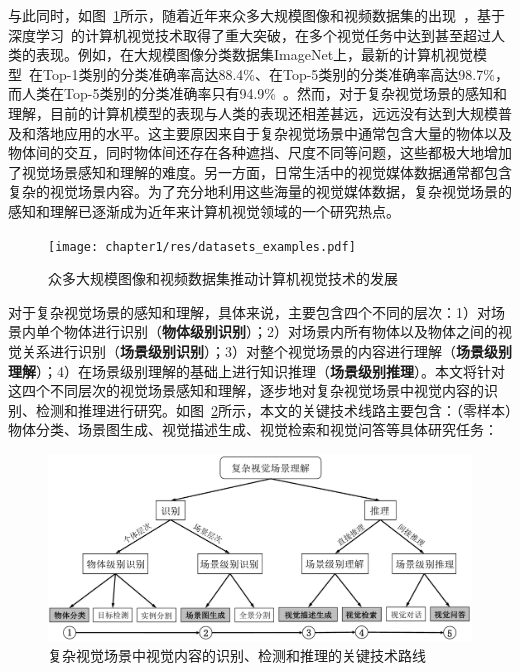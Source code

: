 与此同时，如图~\ref{ch1:fig:datasets_examples}所示，随着近年来众多大规模图像和视频数据集的出现~\cite{lin2014microsoft,russakovsky2015imagenet,krishna2017visual,karpathy2014large,miech2019howto100m}，基于深度学习~\cite{lecun2015deep,krizhevsky2012imagenet}的计算机视觉技术取得了重大突破，在多个视觉任务中达到甚至超过人类的表现。例如，在大规模图像分类数据集ImageNet上，最新的计算机视觉模型~\cite{xie2019self}在Top-1类别的分类准确率高达88.4\%、在Top-5类别的分类准确率高达98.7\%，而人类在Top-5类别的分类准确率只有94.9\%~\cite{russakovsky2015imagenet}。然而，对于复杂视觉场景的感知和理解，目前的计算机模型的表现与人类的表现还相差甚远，远远没有达到大规模普及和落地应用的水平。这主要原因来自于复杂视觉场景中通常包含大量的物体以及物体间的交互，同时物体间还存在各种遮挡、尺度不同等问题，这些都极大地增加了视觉场景感知和理解的难度。另一方面，日常生活中的视觉媒体数据通常都包含复杂的视觉场景内容。为了充分地利用这些海量的视觉媒体数据，复杂视觉场景的感知和理解已逐渐成为近年来计算机视觉领域的一个研究热点。

\begin{figure}[t]
    \centering
        \texttt{[image: chapter1/res/datasets\_examples.pdf]}
    \caption{众多大规模图像和视频数据集推动计算机视觉技术的发展}
    \label{ch1:fig:datasets_examples}
\end{figure}

对于复杂视觉场景的感知和理解，具体来说，主要包含四个不同的层次：1）对场景内单个物体进行识别（\textbf{物体级别识别}）；2）对场景内所有物体以及物体之间的视觉关系进行识别（\textbf{场景级别识别}）；3）对整个视觉场景的内容进行理解（\textbf{场景级别理解}）；4）在场景级别理解的基础上进行知识推理（\textbf{场景级别推理}）。本文将针对这四个不同层次的视觉场景感知和理解，逐步地对复杂视觉场景中视觉内容的识别、检测和推理进行研究。如图~\ref{ch1:fig:scene_understanding}所示，本文的关键技术线路主要包含：（零样本）物体分类、场景图生成、视觉描述生成、视觉检索和视觉问答等具体研究任务：

\begin{figure}[t]
    \centering
        \includegraphics[width=0.95\linewidth]{chapter1/res/scene_understanding.pdf}
    \centering
    \caption{复杂视觉场景中视觉内容的识别、检测和推理的关键技术路线}
    \label{ch1:fig:scene_understanding}
\end{figure}

